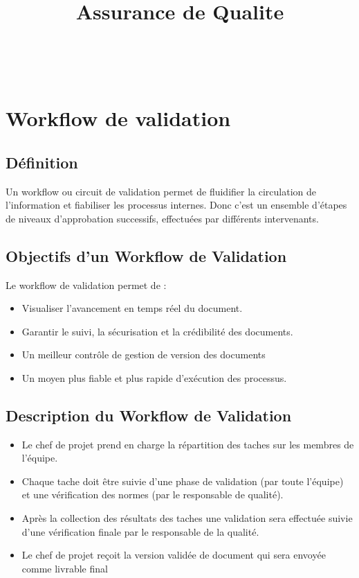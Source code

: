 \documentclass[11pt,fleqn]{book} %
\begin{document}
\title{Assurance de Qualite}

\begingroup
{}
\endgroup


\newpage
~\vfill
\thispagestyle{empty}


\pagestyle{empty} %

\tableofcontents

\pagestyle{fancy} %

\chapter{Workflow de validation}
\section{Définition}
Un workflow ou circuit de validation permet de fluidifier la circulation de l’information et fiabiliser les processus internes. Donc c’est un ensemble d’étapes de niveaux d’approbation successifs, effectuées par différents intervenants.
\section{Objectifs d’un Workflow de Validation}
Le workflow de validation permet de :
\begin{itemize}
    \item Visualiser l’avancement en temps réel du document.
    \item Garantir le suivi, la sécurisation et la crédibilité des documents.
    \item Un meilleur contrôle de gestion de version des documents
    \item Un moyen plus fiable et plus rapide d’exécution des processus.
\end{itemize}
\section{Description du Workflow de Validation}
\begin{itemize}
    \item Le chef de projet prend en charge la répartition des taches sur les membres de l’équipe.
    \item Chaque tache doit être suivie d’une phase de validation (par toute l’équipe) et une vérification des normes (par le responsable de qualité).
    \item Après la collection des résultats des taches une validation sera effectuée suivie d’une vérification finale par le responsable de la qualité.
    \item Le chef de projet reçoit la version validée de document qui sera envoyée comme livrable final
\end{itemize}
\newpage
\end{document}
